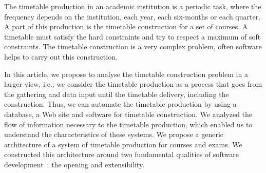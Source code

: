 The timetable production in an academic institution is a periodic
task, where the frequency depends on the institution, each year,
each six-months or each quarter. A part of this production is the
timetable construction for a set of courses. A timetable must
satisfy the hard constraints and try to respect a maximum of soft
constraints. The timetable construction is a very complex problem,
often software helps to carry out this construction.

In this article, we propose to analyse the timetable construction
problem in a larger view, i.e., we consider the timetable
production as a process that goes from the gathering and data
input until the timetable delivery, including the construction.
Thus, we can automate the timetable production by using a
database, a Web site and software for timetable construction. We
analyzed the flow of information necessary to the timetable
production, which enabled us to understand the characteristics of
these systems. We propose a generic architecture of a system of
timetable production for courses and exams. We constructed this
architecture around two fundamental qualities of software
development~: the opening and extensibility.
